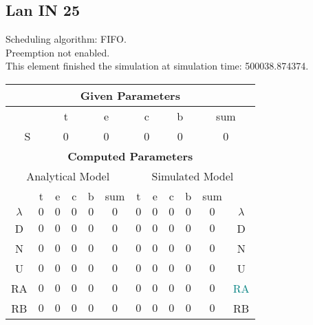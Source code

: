 \documentclass{article}
\begin{document}
\subsection{Lan IN 25}
Scheduling algorithm: FIFO.\\Preemption not enabled. \\This element finished the simulation at simulation time: 500038.874374.\\
\begin{table}[H]\centering\begin{tabular}{@{}c|cccc|c||cccc|c|c@{}}\toprule\multicolumn{12}{c}{\textbf{Given Parameters}}\\\midrule\multicolumn{2}{c|}{ } & \multicolumn{2}{c}{t} & \multicolumn{2}{c}{e} & \multicolumn{2}{c}{c} & \multicolumn{2}{c}{b} & \multicolumn{2}{|c}{sum} \\ \midrule\multicolumn{2}{c|}{S} & \multicolumn{2}{c}{0} & \multicolumn{2}{c}{0} & \multicolumn{2}{c}{0} & \multicolumn{2}{c}{0} & \multicolumn{2}{|c}{0}\\ \midrule\midrule\multicolumn{12}{c}{\textbf{Computed Parameters}}\\ \midrule\multicolumn{6}{c||}{Analytical Model} & \multicolumn{6}{c}{Simulated Model}\\ 
 \midrule & t & e & c & b & sum & t & e & c & b & sum &  \\ \midrule$\lambda$ &$0$ & $0$ & $0$ & $0$ & $0$ & $0$ & $0$ & $0$ & $0$ & $0$& $\lambda$ \\D & $0$ & $0$ & $0$ & $0$ & $0$ & $0$ & $0$ & $0$ & $0$ & $0$& D\\N & $0$ & $0$ & $0$ & $0$ & $0$ & $0$ & $0$ & $0$ & $0$ & $0$& N\\U & $0$ & $0$ & $0$ & $0$ & $0$ & $0$ & $0$ & $0$ & $0$ & $0$& U\\RA & $0$ & $0$ & $0$ & $0$ & $0$ & $0$ & $0$ & $0$ & $0$ & $0$& \textcolor{teal}{RA}\\RB & $0$ & $0$ & $0$ & $0$ & $0$ & $0$ & $0$ & $0$ & $0$ & $0$& RB\\
\bottomrule
\end{tabular}
\end{table}
\filbreak
\end{document}
